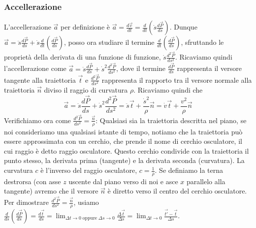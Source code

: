 \subsubsection{Accellerazione}
L'accellerazione $\vec{a}$ per definizione è $\vec{a} = \frac{d \vec{v}}{dt} = \frac{d}{dt}(\dot{s} \frac{d \vec{P}}{ds})$.\newline
Dunque $\vec{a} = \ddot{s} \frac{d \vec{P}}{ds} + \dot{s} \frac{d}{dt}\left(\frac{d \vec{P}}{ds}\right)$, posso ora studiare il termine $\frac{d}{dt}\left(\frac{d \vec{P}}{ds}\right)$, sfruttando le proprietà della derivata di una funzione di funzione, $\dot{s} \frac{d^2 \vec{P}}{ds^2}$.\newline
Ricaviamo quindi l'accellerazione come $\vec{a} = \ddot{s} \frac{d \vec{P}}{ds} + \dot{s}^2 \frac{d^2 \vec{P}}{ ds^2}$, dove il termine $\frac{d \vec{P}}{ds}$ rappresenta il versore tangente alla traiettoria $\vec{t}$ e $\frac{d^2 \vec{P}}{ ds^2}$ rappresenta il rapporto tra il versore normale alla traiettoria $\vec{n}$ diviso il raggio di curvatura $\rho$. Ricaviamo quindi che
\[
    \vec{a} = \ddot{s} \frac{d \vec{P}}{ds} + \dot{s}^2 \frac{d^2 \vec{P}}{ ds^2} = \ddot{s} \vec{t} + \frac{ \dot{s}^2}{\rho}\vec{n} = \dot{v} \vec{t} + \frac{v^2}{\rho}\vec{n}
\]
Verifichiamo ora come $\frac{d^2 \vec{P}}{ds^2} = \frac{\vec{n}}{\rho}$:\newline
Qualsiasi sia la traiettoria descritta nel piano, se noi consideriamo una qualsiasi istante di tempo, notiamo che la traiettoria può essere approssimata con un cerchio, che prende il nome di cerchio osculatore, il cui raggio è detto raggio osculatore.\newline
Questo cerchio condivide con la traiettoria il punto stesso, la derivata prima (tangente) e la derivata seconda (curvatura). La curvatura $c$ è l'inverso del raggio osculatore, $c = \frac{1}{\rho}$. Se definiamo la terna destrorsa (con asse $z$ uscente dal piano verso di noi e asce $x$ parallelo alla tangente) avremo che il versore $\vec{n}$ è diretto verso il centro del cerchio osculatore.\newline
Per dimostrare $\frac{d^2 \vec{P}}{ds^2} = \frac{\vec{n}}{\rho}$, usiamo $\frac{d}{ds} \left(\frac{d \vec{P}}{ds}\right) = \frac{d \vec{t}}{ds} = \lim_{\Delta t\rightarrow 0 \;\text{oppure}\;\Delta s \rightarrow 0} \frac{\Delta \vec{t}}{\Delta s} = \lim_{\Delta t\rightarrow 0} \frac{\vec{t'}- \vec{t}}{\Delta s}$.\newline
